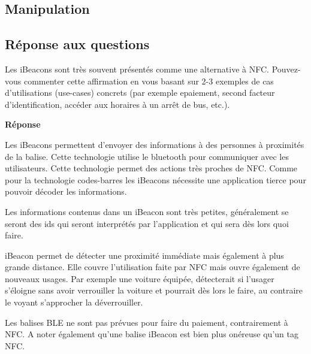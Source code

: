\documentclass[francais,12pt]{article}
\begin{document}
	\subsection*{Manipulation}
	\subsection*{Réponse aux questions}
	Les iBeacons sont très souvent présentés comme une alternative à NFC. Pouvez-vous commenter cette affirmation en vous basant sur 2-3 exemples de cas d’utilisations (use-cases) concrets (par exemple epaiement, second facteur d’identification, accéder aux horaires à un arrêt de bus, etc.). 

	{\color[rgb]{0,0.5,0.23}\textbf{Réponse}}
	
	Les iBeacons permettent d'envoyer des informations à des personnes à proximités de la balise. Cette technologie utilise le bluetooth pour communiquer avec les utilisateurs. Cette technologie permet des actions très proches de NFC. Comme pour la technologie codes-barres les iBeacons nécessite une application tierce pour pouvoir décoder les informations.
	
	Les informations contenus dans un iBeacon sont très petites, généralement se seront des ids qui seront interprétés par l'application et qui sera dès lors quoi faire.
	
	iBeacon permet de détecter une proximité immédiate mais également à plus grande distance. Elle couvre l'utilisation faite par NFC mais ouvre également de nouveaux usages. Par exemple une voiture équipée, détecterait si l'usager s'éloigne sans avoir verrouiller la voiture et pourrait dès lors le faire, au contraire le voyant s'approcher la déverrouiller.
	
	Les balises BLE ne sont pas prévues pour faire du paiement, contrairement à NFC. A noter également qu'une balise iBeacon est bien plus onéreuse qu'un tag NFC.
	
\end{document}
